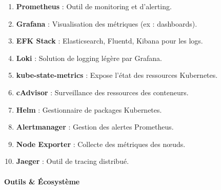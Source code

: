 \documentclass[
  letterpaper,
  DIV=11,
  numbers=noendperiod]{scrartcl}
\makeatletter
\let\oldparagraph\paragraph
\renewcommand{\paragraph}{
    \@ifstar
      \xxxParagraphStar
      \xxxParagraphNoStar
  }
\newcommand{\xxxParagraphStar}[1]{\oldparagraph*{#1}\mbox{}}
\newcommand{\xxxParagraphNoStar}[1]{\oldparagraph{#1}\mbox{}}
\providecommand{\tightlist}{%
  \setlength{\itemsep}{0pt}\setlength{\parskip}{0pt}}\usepackage{longtable,booktabs,array}
\makeatother
\begin{document}
\begin{enumerate}
\def\labelenumi{\arabic{enumi}.}
\setcounter{enumi}{60}
\tightlist
\item
  \textbf{Prometheus} : Outil de monitoring et d'alerting.\\
\item
  \textbf{Grafana} : Visualisation des métriques (ex : dashboards).\\
\item
  \textbf{EFK Stack} : Elasticsearch, Fluentd, Kibana pour les logs.\\
\item
  \textbf{Loki} : Solution de logging légère par Grafana.\\
\item
  \textbf{kube-state-metrics} : Expose l'état des ressources
  Kubernetes.\\
\item
  \textbf{cAdvisor} : Surveillance des ressources des conteneurs.\\
\item
  \textbf{Helm} : Gestionnaire de packages Kubernetes.\\
\item
  \textbf{Alertmanager} : Gestion des alertes Prometheus.\\
\item
  \textbf{Node Exporter} : Collecte des métriques des nœuds.\\
\item
  \textbf{Jaeger} : Outil de tracing distribué.
\end{enumerate}

\paragraph{\texorpdfstring{\textbf{Outils \&
Écosystème}}{Outils \& Écosystème}}\label{outils-uxe9cosystuxe8me}
\end{document}
